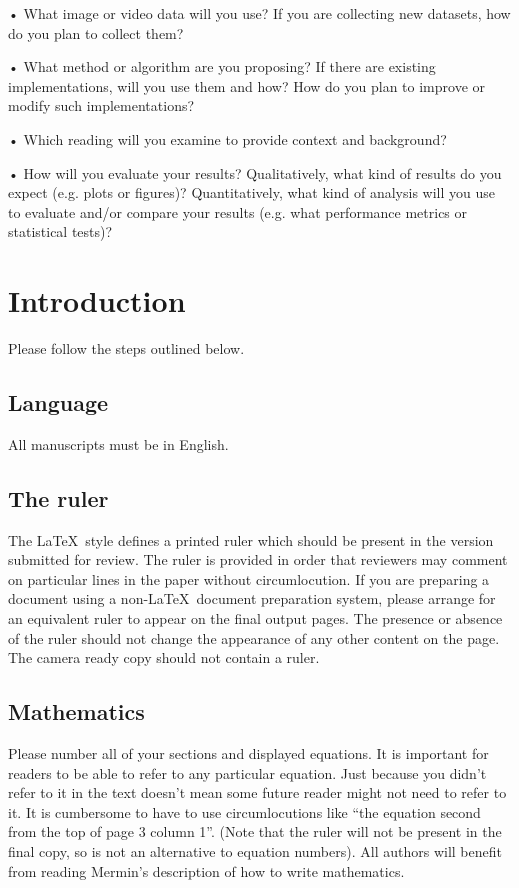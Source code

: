 \documentclass[10pt,twocolumn,letterpaper]{article}
\begin{document}
• What image or video data will you use? If you are collecting new datasets, how do you plan to collect them?

• What method or algorithm are you proposing? If there are existing implementations, will you use them and how? How do you plan to improve or modify such implementations?

• Which reading will you examine to provide context and background?

• How will you evaluate your results? Qualitatively, what kind of results do you expect (e.g. plots or figures)? Quantitatively, what kind of analysis will you use to evaluate and/or compare your results (e.g. what performance metrics or statistical tests)?

\section{Introduction}

Please follow the steps outlined below.
\vspace{3cm}

\subsection{Language}

All manuscripts must be in English.

\subsection{The ruler}
The \LaTeX\ style defines a printed ruler which should be present in the
version submitted for review.  The ruler is provided in order that
reviewers may comment on particular lines in the paper without
circumlocution.  If you are preparing a document using a non-\LaTeX\
document preparation system, please arrange for an equivalent ruler to
appear on the final output pages.  The presence or absence of the ruler
should not change the appearance of any other content on the page.  The
camera ready copy should not contain a ruler.

\subsection{Mathematics}

Please number all of your sections and displayed equations.  It is
important for readers to be able to refer to any particular equation.  Just
because you didn't refer to it in the text doesn't mean some future reader
might not need to refer to it.  It is cumbersome to have to use
circumlocutions like ``the equation second from the top of page 3 column
1''.  (Note that the ruler will not be present in the final copy, so is not
an alternative to equation numbers).  All authors will benefit from reading
Mermin's description of how to write mathematics.%
\end{document}
